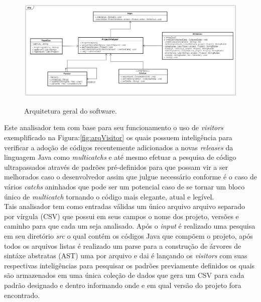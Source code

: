 \begin{figure}[h]
	\center
	\includegraphics[width=1.0\textwidth]{Imagens/Arquitetura}
	\label{fig:arqGeral}
	\caption{Arquitetura geral do software.}
\end{figure}

Este analisador tem com base para seu funcionamento o uso de {\it visitors} \cite{Gamma:1995:DPE:186897} exemplificado na Figura:\ref{fig:arqVisitor} os quais possuem inteligência para verificar a adoção de códigos recentemente adicionados a novas {\it releases} da linguagem Java como {\it multicatchs} e até mesmo efetuar a pesquisa de código ultrapassados através de padrões pré-definidos para que possam vir a ser melhorados caso o desenvolvedor assim que julgue necessário conforme é o caso de vários {\it catchs} aninhados que pode ser um potencial caso de se tornar um bloco único de {\it multicatch} tornando o código mais elegante, atual e legível.\\

Tais analisador tem como entradas válidas um único arquivo arquivo separado por vírgula (CSV) que possui em seus campos o nome dos projeto, versões e caminho para que cada um seja analisado. Após o {\it input} é realizado uma pesquisa em seu diretório \textit{src} o qual contém os códigos Java que compõem o projeto, após todos os arquivos listas é realizado um parse para a construção de árvores de sintáxe abstratas (AST) uma por arquivo e dai é lançando os {\it visitors}  \cite{Gamma:1995:DPE:186897} com suas respectivas inteligências para pesquisar os padrões previamente definidos os quais são armazenados em uma única coleção de dados que gera um CSV para cada padrão designado e dentro informando onde e em qual versão do projeto fora encontrado.\\
	
\clearpage
